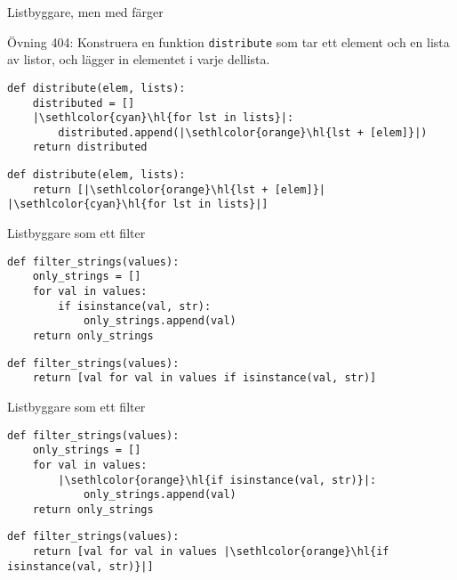 \begin{frame}[fragile]{Listbyggare, men med färger}

  Övning 404: Konstruera en funktion \texttt{distribute} som tar ett element och
  en lista av listor, och lägger in elementet i varje dellista.

  \begin{lstlisting}
def distribute(elem, lists):
    distributed = []
    |\sethlcolor{cyan}\hl{for lst in lists}|:
        distributed.append(|\sethlcolor{orange}\hl{lst + [elem]}|)
    return distributed
  \end{lstlisting}

  \begin{lstlisting}
def distribute(elem, lists):
    return [|\sethlcolor{orange}\hl{lst + [elem]}| |\sethlcolor{cyan}\hl{for lst in lists}|]
  \end{lstlisting}

\end{frame}

\begin{frame}[fragile]{Listbyggare som ett filter}
  \begin{lstlisting}
def filter_strings(values):
    only_strings = []
    for val in values:
        if isinstance(val, str):
            only_strings.append(val)
    return only_strings
  \end{lstlisting}

  \begin{lstlisting}
def filter_strings(values):
    return [val for val in values if isinstance(val, str)]
  \end{lstlisting}

\end{frame}

\begin{frame}[fragile]{Listbyggare som ett filter}
  \begin{lstlisting}
def filter_strings(values):
    only_strings = []
    for val in values:
        |\sethlcolor{orange}\hl{if isinstance(val, str)}|:
            only_strings.append(val)
    return only_strings
  \end{lstlisting}

  \begin{lstlisting}
def filter_strings(values):
    return [val for val in values |\sethlcolor{orange}\hl{if isinstance(val, str)}|]
  \end{lstlisting}

\end{frame}


